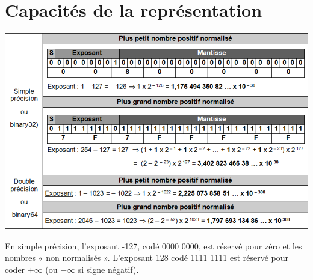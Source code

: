\documentclass[10pt,fleqn]{article} %
\begin{document}
\section{Capacités de la représentation}

\begin{center}
\includegraphics[width=.7\textwidth]{images/reel_4_0}
\end{center}

En simple précision, l’exposant  -127, codé 0000 0000, est réservé pour zéro et les nombres « non normalisés ». L’exposant 128 codé  1111 1111 est réservé pour coder $+\infty$ (ou $-\infty$ si signe négatif).



\begin{thebibliography}{2}
\end{thebibliography}
\end{document}
